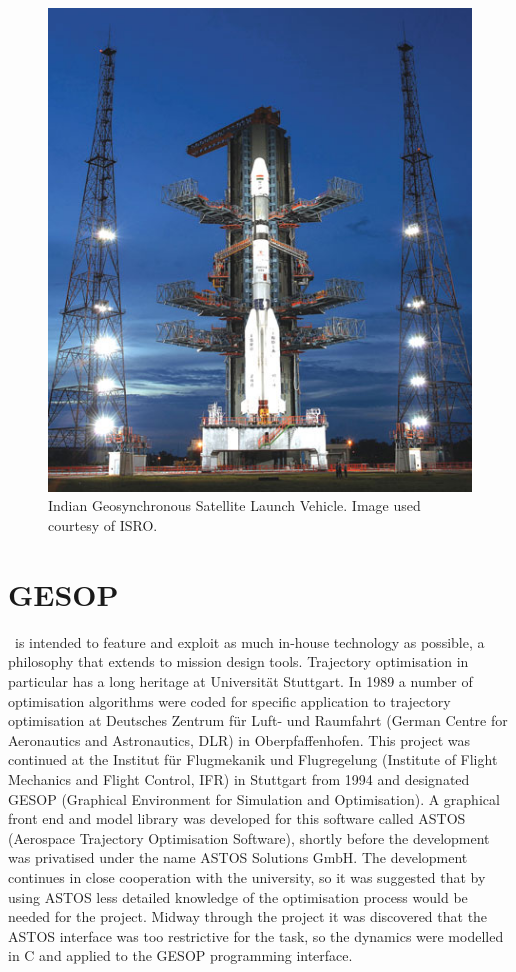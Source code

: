 \begin{figure} [h]
\centering
\includegraphics[scale=0.50]{Images/GSLV2.jpg}
\caption{Indian Geosynchronous Satellite Launch Vehicle. Image used courtesy of ISRO.} \label{fig:GSLV}
\end{figure}

\section{GESOP} \label{sec:GESOP}

\BW\ is intended to feature and exploit as much in-house technology as possible, a philosophy that extends to mission design tools. Trajectory optimisation in particular has a long heritage at Universit\"{a}t Stuttgart. In 1989 a number of optimisation algorithms were coded for specific application to trajectory optimisation at Deutsches Zentrum f\"{u}r Luft- und Raumfahrt (German Centre for Aeronautics and Astronautics, DLR) in Oberpfaffenhofen. This project was continued at the Institut f\"{u}r Flugmekanik und Flugregelung (Institute of Flight Mechanics and Flight Control, IFR) in Stuttgart from 1994 and designated GESOP (Graphical Environment for Simulation and Optimisation). A graphical front end and model library was developed for this software called ASTOS (Aerospace Trajectory Optimisation Software), shortly before the development was privatised under the name ASTOS Solutions GmbH. The development continues in close cooperation with the university, so it was suggested that by using ASTOS less detailed knowledge of the optimisation process would be needed for the project. Midway through the project it was discovered that the ASTOS interface was too restrictive for the task, so the dynamics were modelled in C and applied to the GESOP programming interface.


